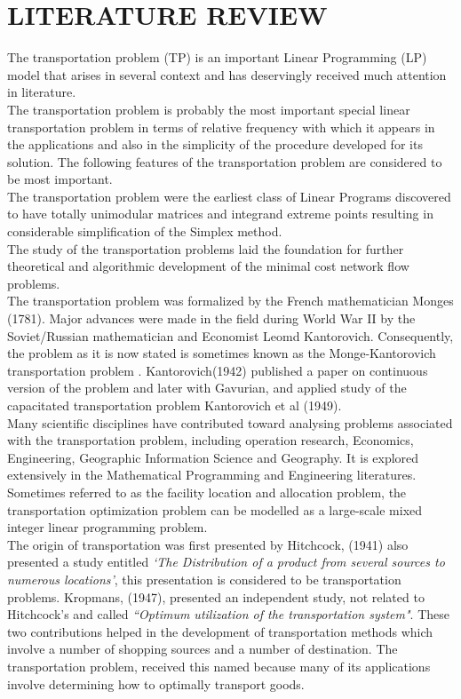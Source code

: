 \documentclass[12pt]{report}
\newcommand{\NI}{\noindent}
\newcommand{\stp}{transportation problem }
\newcommand{\stps}{transportation problems }
\begin{document}
	
	\chapter{LITERATURE REVIEW}
	The \stp (TP) is an important Linear Programming (LP) model that arises in several context and has deservingly received much attention in literature.\\
	
	\NI The \stp is probably the most important special linear \stp in terms of relative frequency with which it appears in the applications and also in the simplicity of the procedure developed for its solution. The following features of the transportation problem are considered to be most important.\\
	
	\NI The \stp were the earliest class of Linear Programs discovered to have totally unimodular matrices and integrand extreme points resulting in considerable simplification of the Simplex method.\\
	
	\NI The study of the \stps laid the foundation for further theoretical and algorithmic development of the minimal cost network flow problems.\\
	
	\NI The \stp was formalized by the French mathematician Monges (1781). Major advances were made in the field during World War II by the Soviet/Russian mathematician and Economist Leomd Kantorovich. Consequently, the problem as it is now stated is sometimes known as the Monge-Kantorovich \stp. Kantorovich(1942) published a paper on continuous version of the problem and later with Gavurian, and applied study of the capacitated transportation problem Kantorovich et al (1949).\\
	
	\NI Many scientific disciplines have contributed toward analysing problems associated with the transportation problem, including operation research, Economics, Engineering, Geographic Information Science and Geography. It is explored extensively in the Mathematical Programming and Engineering literatures. Sometimes referred to as the facility location and allocation problem, the transportation optimization problem can be modelled as a large-scale mixed integer linear programming problem.\\
	
	\NI The origin of transportation was first presented by Hitchcock, (1941) also presented a study entitled \textit{`The Distribution of a product from several sources to numerous locations'}, this presentation is considered to be transportation problems. Kropmans, (1947), presented an independent study, not related to Hitchcock's and called \textit{``Optimum utilization of the transportation system"}. These two contributions helped in the development of transportation methods which involve a number of shopping sources and a number of destination. The transportation problem, received this named because many of its applications involve determining how to optimally transport goods.
	
\end{document}
